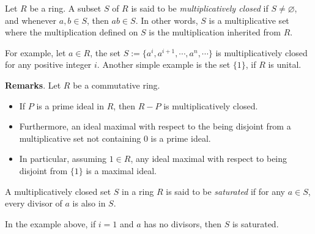 \documentclass[12pt]{article}
\begin{document}
Let $R$ be a ring.  A subset $S$ of $R$ is said to be \emph{multiplicatively closed} if $S\ne \varnothing$, and whenever $a,b\in S$, then $ab\in S$.  In other words, $S$ is a multiplicative set where the multiplication defined on $S$ is the multiplication inherited from $R$.

For example, let $a\in R$, the set $S:=\lbrace a^i, a^{i+1}, \cdots, a^n, \cdots \rbrace$ is multiplicatively closed for any positive integer $i$.  Another simple example is the set $\lbrace 1\rbrace$, if $R$ is unital.

\textbf{Remarks}.  Let $R$ be a commutative ring.
\begin{itemize}
\item
If $P$ is a prime ideal in $R$, then $R-P$ is multiplicatively closed.
\item 
Furthermore, an ideal maximal with respect to the being disjoint from a multiplicative set not containing $0$ is a prime ideal.
\item
In particular, assuming $1\in R$, any ideal maximal with respect to being disjoint from $\lbrace 1\rbrace$ is a maximal ideal.
\end{itemize}

A multiplicatively closed set $S$ in a ring $R$ is said to be \emph{saturated} if for any $a\in S$, every divisor of $a$ is also in $S$.

In the example above, if $i=1$ and $a$ has no divisors, then $S$ is saturated.  
\end{document}
